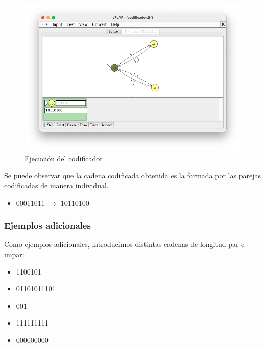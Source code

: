 \begin{figure}[H] 
	\centering
	\includegraphics[scale=0.55]{../practica_3/images/ejecucion_codificador.png} 
	\caption{Ejecución del codificador} 
    \label{fig:ejecucion_codificador}
\end{figure}

Se puede observar que la cadena codificada obtenida es la formada por las parejas codificadas de manera individual.
\begin{itemize}
	\item 00011011 $\rightarrow$ 10110100
\end{itemize}

\subsubsection{Ejemplos adicionales}

Como ejemplos adicionales, introducimos distintas cadenas de longitud par e impar:
\begin{itemize}
	\item 1100101
	\item 01101011101
	\item 001
	\item 111111111
	\item 000000000
\end{itemize}

